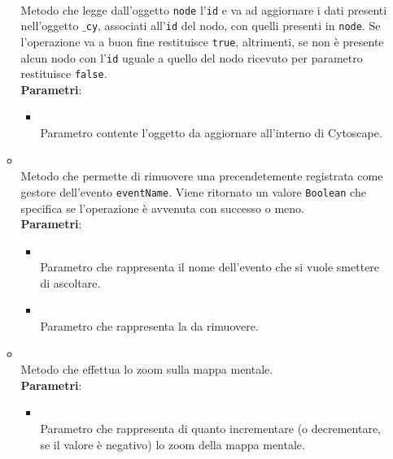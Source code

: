 \begin{itemize}
\begin{itemize}
\\ Metodo che legge dall'oggetto \texttt{node} l'\texttt{id} e va ad aggiornare i dati presenti nell'oggetto \texttt{$\_$cy}, associati all'\texttt{id} del nodo, con quelli presenti in \texttt{node}. Se l'operazione va a buon fine restituisce \texttt{true}, altrimenti, se non è presente alcun nodo con l'\texttt{id} uguale a quello del nodo ricevuto per parametro restituisce \texttt{false}.
\\ \textbf{Parametri}:
\begin{itemize}
\item {}
\\ Parametro contente l'oggetto da aggiornare all'interno di Cytoscape.
\end{itemize}
\item {}
\\ Metodo che permette di rimuovere una  precendetemente registrata come gestore dell'evento \texttt{eventName}. Viene ritornato un valore \texttt{Boolean} che specifica se l'operazione è avvenuta con successo o meno.
\\ \textbf{Parametri}:
\begin{itemize}
\item {}
\\ Parametro che rappresenta il nome dell'evento che si vuole smettere di ascoltare.
\item {}
\\ Parametro che rappresenta la  da rimuovere.
\end{itemize}
\item {}
\\ Metodo che effettua lo zoom sulla mappa mentale.
\\ \textbf{Parametri}:
\begin{itemize}
\item {}
\\ Parametro che rappresenta di quanto incrementare (o decrementare, se il valore è negativo) lo zoom della mappa mentale.
\end{itemize}
\end{itemize}
\end{itemize}
\label{\nogloxy{Premi::Front-End::Services::MindmapService}}
